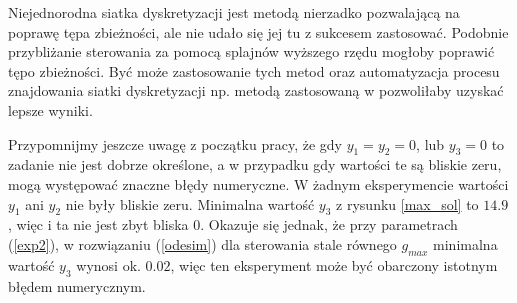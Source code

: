\documentclass[11pt]{article}
\begin{document}
Niejednorodna siatka dyskretyzacji jest metodą nierzadko pozwalającą na poprawę tępa zbieżności, ale nie udało się jej tu z sukcesem zastosować. Podobnie przybliżanie sterowania za pomocą splajnów wyższego rzędu mogłoby poprawić tępo zbieżności. Być może zastosowanie tych metod oraz automatyzacja procesu znajdowania siatki dyskretyzacji np. metodą zastosowaną w \cite{Rao-ph} pozwoliłaby uzyskać lepsze wyniki.

Przypomnijmy jeszcze uwagę z początku pracy, że gdy $y_1 = y_2 = 0$, lub $y_3 = 0$ to zadanie nie jest dobrze określone, a w przypadku gdy wartości te są bliskie zeru, mogą występować znaczne błędy numeryczne. W żadnym eksperymencie wartości $y_1$ ani $y_2$ nie były bliskie zeru. Minimalna wartość $y_3$ z rysunku \ref{max_sol} to $14.9$, więc i ta nie jest zbyt bliska 0. Okazuje się jednak, że przy parametrach (\ref{exp2}), w rozwiązaniu (\ref{odesim}) dla sterowania stale równego $g_{max}$ minimalna wartość $y_3$ wynosi ok. $0.02$, więc ten eksperyment może być obarczony istotnym błędem numerycznym.

\newpage{}
{}

\end{document}
